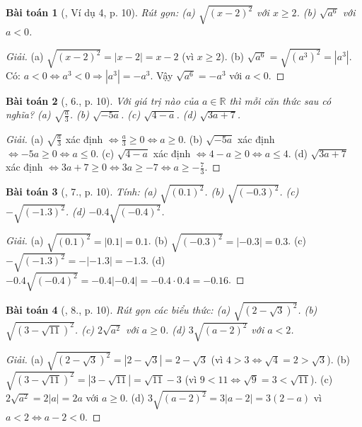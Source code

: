 \documentclass{article}
\newtheorem{baitoan}{Bài toán}
\begin{document}
\begin{baitoan}[\cite{SGK_Toan_9_tap_1}, Ví dụ 4, p. 10]
	Rút gọn: (a) $\sqrt{(x - 2)^2}$ với $x\ge2$. (b) $\sqrt{a^6}$ với $a < 0$.
\end{baitoan}

\begin{proof}[Giải]
	(a) $\sqrt{(x - 2)^2} = |x - 2| = x - 2$ (vì $x\ge2$). (b) $\sqrt{a^6} = \sqrt{(a^3)^2} = |a^3|$. Có: $a < 0\Leftrightarrow a^3 < 0\Rightarrow|a^3| = -a^3$. Vậy $\sqrt{a^6} = -a^3$ với $a < 0$.
\end{proof}

\begin{baitoan}[\cite{SGK_Toan_9_tap_1}, 6., p. 10]
	Với giá trị nào của $a\in\mathbb{R}$ thì mỗi căn thức sau có nghĩa? (a) $\sqrt{\frac{a}{3}}$. (b) $\sqrt{-5a}$. (c) $\sqrt{4 - a}$. (d) $\sqrt{3a + 7}$.
\end{baitoan}

\begin{proof}[Giải]
	(a) $\sqrt{\frac{a}{3}}$ xác định $\Leftrightarrow\frac{a}{3}\ge0\Leftrightarrow a\ge0$. (b) $\sqrt{-5a}$ xác định $\Leftrightarrow-5a\ge0\Leftrightarrow a\le0$. (c) $\sqrt{4 - a}$ xác định $\Leftrightarrow4 - a\ge0\Leftrightarrow a\le4$. (d) $\sqrt{3a + 7}$ xác định $\Leftrightarrow3a + 7\ge0\Leftrightarrow3a\ge-7\Leftrightarrow a\ge-\frac{7}{3}$.
\end{proof}

\begin{baitoan}[\cite{SGK_Toan_9_tap_1}, 7., p. 10]
	Tính: (a) $\sqrt{(0.1)^2}$. (b) $\sqrt{(-0.3)^2}$. (c) $-\sqrt{(-1.3)^2}$. (d) $-0.4\sqrt{(-0.4)^2}$.
\end{baitoan}

\begin{proof}[Giải]
	(a) $\sqrt{(0.1)^2} = |0.1| = 0.1$. (b) $\sqrt{(-0.3)^2} = |-0.3| = 0.3$. (c) $-\sqrt{(-1.3)^2} = -|-1.3| = -1.3$. (d) $-0.4\sqrt{(-0.4)^2} = -0.4|-0.4| = -0.4\cdot0.4 = -0.16$.
\end{proof}

\begin{baitoan}[\cite{SGK_Toan_9_tap_1}, 8., p. 10]
	Rút gọn các biểu thức: (a) $\sqrt{(2 - \sqrt{3})^2}$. (b) $\sqrt{(3 - \sqrt{11})^2}$. (c) $2\sqrt{a^2}$ với $a\ge0$. (d) $3\sqrt{(a - 2)^2}$ với $a < 2$.
\end{baitoan}

\begin{proof}[Giải]
	(a) $\sqrt{(2 - \sqrt{3})^2} = |2 - \sqrt{3}| = 2 - \sqrt{3}$ (vì $4 > 3\Leftrightarrow\sqrt{4} = 2 > \sqrt{3}$). (b) $\sqrt{(3 - \sqrt{11})^2} = |3 - \sqrt{11}| = \sqrt{11} - 3$ (vì $9 < 11\Leftrightarrow\sqrt{9} = 3 < \sqrt{11}$). (c) $2\sqrt{a^2} = 2|a| = 2a$ với $a\ge0$. (d) $3\sqrt{(a - 2)^2} = 3|a - 2| = 3(2 - a)$ vì $a < 2\Leftrightarrow a - 2 < 0$.
\end{proof}
\end{document}
